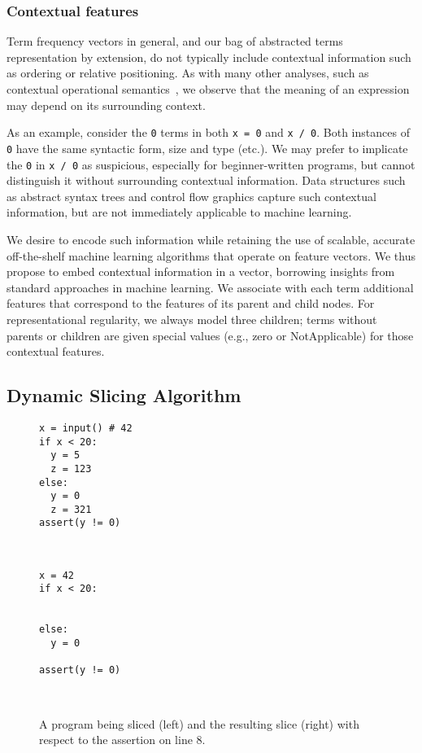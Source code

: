 \documentclass[conference]{IEEEtran}
\newcommand\lt[1]{{\lstinline|#1|}}
\begin{document}
\subsubsection{Contextual features}

Term frequency vectors in general, and our bag of abstracted terms
representation by extension, do not typically include contextual
information such as ordering or relative positioning. As with many other
analyses, such as contextual operational semantics~\cite{FIXME}, we observe
that the meaning of an expression may depend on its surrounding context.

As an example, consider the \lt{0} terms in both \lt{x = 0} and \lt{x / 0}.
Both instances of \lt{0} have the same syntactic form, size and type
(etc.). We may prefer to implicate the \lt{0} in \lt{x / 0} as suspicious,
especially for beginner-written programs, but cannot distinguish it without
surrounding contextual information. Data structures such as abstract syntax
trees and control flow graphics capture such contextual information, but
are not immediately applicable to machine learning.

We desire to encode such information while retaining the use of scalable,
accurate off-the-shelf machine learning algorithms that operate on feature
vectors. We thus propose to embed contextual information in a vector,
borrowing insights from standard approaches in machine learning. We
associate with each term additional features that correspond to the features of
its parent and child nodes. For representational regularity, we always
model three children; terms without parents or children are given special
values (e.g., zero or NotApplicable) for those contextual features.

\subsection{Dynamic Slicing Algorithm}
\label{sec-slice-algorithm}

\begin{figure}
\begin{lrbox}{\verbsavebox}
\begin{lstlisting}[xrightmargin=0.5\linewidth]
x = input() # 42
if x < 20:
  y = 5
  z = 123
else:
  y = 0
  z = 321
assert(y != 0)
\end{lstlisting}
\end{lrbox}
~ \hfill
{}
\hfill
\begin{lrbox}{\verbsavebox}
\begin{lstlisting}[xrightmargin=0.5\linewidth]
x = 42
if x < 20:


else:
  y = 0

assert(y != 0)
\end{lstlisting}
\end{lrbox}
\hfill
~
\caption{
  A program being sliced (left) and the resulting slice (right) with
  respect to the assertion on line 8.
}
\label{fig-slice-example}
\end{figure}
\end{document}
